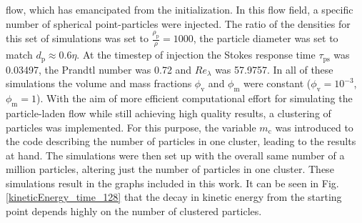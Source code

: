 \documentclass[11pt,a4paper,openany,oneside,parskip=half*]{article}
\begin{document}
flow, which has emancipated from the initialization. In this flow field, a specific number of spherical point-particles were injected. 
\newline
The ratio of the densities for this set of simulations was set to $\frac{\rho_\mathrm{p}}{\rho} = 1000$, the particle diameter was set to match $d_\mathrm{p} \approx 0.6 \eta$. At the timestep of injection the Stokes response time $\tau_\mathrm{ps}$ was 0.03497, the Prandtl number was 0.72 and $Re_\lambda$ was 57.9757. In all of these simulations the volume and mass fractions $\phi_\mathrm{v}$ and $\phi_\mathrm{m}$ were constant ($\phi_\mathrm{v}= 10^{-3}$, $\phi_\mathrm{m}=1$). 
\newline
With the aim of more efficient computational effort for simulating the particle-laden flow while still achieving high quality results, a clustering of particles was implemented. For this purpose, the variable $m_\mathrm{c}$ was introduced to the code describing the number of particles in one cluster, leading to the results at hand. The simulations were then set up with the overall same number of  a million particles, altering just the number of particles in one cluster. These simulations result in the graphs included in this work. 
It can be seen in Fig. \ref{kineticEnergy_time_128} that the decay in kinetic energy from the starting point depends highly on the number of clustered particles.
\end{document}
